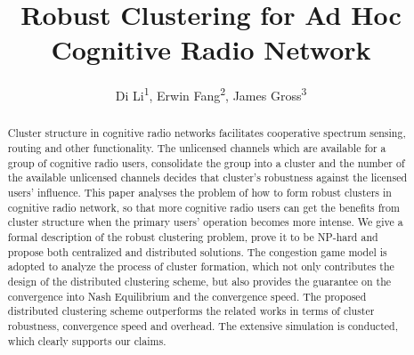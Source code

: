 \documentclass[times]{ettauth}
\theoremstyle{mytheoremstyle}
\theoremstyle{mytheoremstyle}
\theoremstyle{mytheoremstyle}
\begin{document}


\title{Robust Clustering for Ad Hoc Cognitive Radio Network}
\author{Di Li\textsuperscript{1}, Erwin Fang\textsuperscript{2}, James Gross\textsuperscript{3}\corrauth}
\address{RWTH Aachen University\textsuperscript{1}, ETH Zurich\textsuperscript{2}, KTH Royal Institute of Technology\textsuperscript{3} }




\begin{abstract}
Cluster structure in cognitive radio networks facilitates cooperative spectrum sensing, routing and other functionality.
The unlicensed channels which are available for a group of cognitive radio users, consolidate the group into a cluster and the number of the available unlicensed channels decides that cluster's robustness against the licensed users' influence.
This paper analyses the problem of how to form robust clusters in cognitive radio network, so that more cognitive radio users can get the benefits from cluster structure when the primary users' operation becomes more intense.
We give a formal description of the robust clustering problem, prove it to be NP-hard and propose both centralized and distributed solutions.
The congestion game model is adopted to analyze the process of cluster formation, which not only contributes the design of the distributed clustering scheme, but also provides the guarantee on the convergence into Nash Equilibrium and the convergence speed.
The proposed distributed clustering scheme outperforms the related works in terms of cluster robustness, convergence speed and overhead.
The extensive simulation is conducted, which clearly supports our claims.
\end{abstract}
\end{document}
